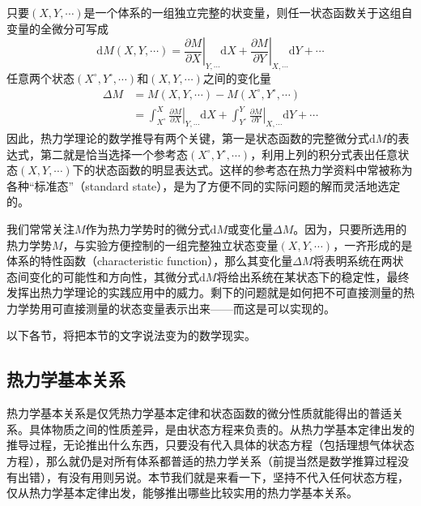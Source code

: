 \documentclass[main.tex]{subfiles}
\begin{document}
只要$\left(X,Y,\cdots\right)$是一个体系的一组独立完整的状变量，则任一状态函数关于这组自变量的全微分可写成
\[\mathrm{d}M\left(X,Y,\cdots\right)=\left.\frac{\partial M}{\partial X}\right|_{Y,\cdots}\mathrm{d}X+\left.\frac{\partial M}{\partial Y}\right|_{X,\cdots}\mathrm{d}Y+\cdots\]
任意两个状态$\left(X^\circ,Y^\circ,\cdots\right)$和$\left(X,Y,\cdots\right)$之间的变化量
\begin{equation}\label{eq:I.1_integral_of_function}
    \begin{aligned}
        \Delta M & =M\left(X,Y,\cdots\right)-M\left(X^\circ,Y^\circ,\cdots\right)                                                                                                                \\
                 & =\int_{X^\circ}^{X}\left.\frac{\partial M}{\partial X}\right|_{Y,\cdots}\mathrm{d}X+\int_{Y^\circ}^{Y}\left.\frac{\partial M}{\partial Y}\right|_{X,\cdots}\mathrm{d}Y+\cdots
    \end{aligned}
\end{equation}
因此，热力学理论的数学推导有两个关键，第一是状态函数的完整微分式$\mathrm{d}M$的表达式，第二就是恰当选择一个参考态$\left(X^\circ,Y^\circ,\cdots\right)$，利用上列的积分式表出任意状态$\left(X,Y,\cdots\right)$下的状态函数的明显表达式。这样的参考态在热力学资料中常被称为各种“标准态”（standard state），是为了方便不同的实际问题的解而灵活地选定的。

我们常常关注$M$作为热力学势时的微分式$\mathrm{d}M$或变化量$\Delta M$。因为，只要所选用的热力学势$M$，与实验方便控制的一组完整独立状态变量$\left(X,Y,\cdots\right)$，一齐形成的是体系的特性函数（characteristic function），那么其变化量$\Delta M$将表明系统在两状态间变化的可能性和方向性，其微分式$\mathrm{d}M$将给出系统在某状态下的稳定性，最终发挥出热力学理论的实践应用中的威力。剩下的问题就是如何把不可直接测量的热力学势用可直接测量的状态变量表示出来——而这是可以实现的。

以下各节，将把本节的文字说法变为的数学现实。

\subsection{热力学基本关系}
热力学基本关系是仅凭热力学基本定律和状态函数的微分性质就能得出的普适关系。具体物质之间的性质差异，是由状态方程来负责的。从热力学基本定律出发的推导过程，无论推出什么东西，只要没有代入具体的状态方程（包括理想气体状态方程），那么就仍是对所有体系都普适的热力学关系（前提当然是数学推算过程没有出错），有没有用则另说。本节我们就是来看一下，坚持不代入任何状态方程，仅从热力学基本定律出发，能够推出哪些比较实用的热力学基本关系。
\end{document}
